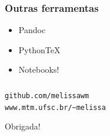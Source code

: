 \documentclass{beamer}
\begin{document}
\begin{frame}
  \frametitle{Outras ferramentas}
  \begin{itemize}
  \item Pandoc
  \item PythonTeX
  \item Notebooks!
  \end{itemize}
\end{frame}

\begin{frame}[fragile]
   \frametitle{}
   \begin{center}
      \begin{minipage}{0.7\textwidth}
      \begin{block}{}
         \begin{center}
            \verb+github.com/melissawm+\\
            \verb+www.mtm.ufsc.br/~melissa+
         \end{center}
      \end{block}
    \end{minipage}
    \vfill

    Obrigada!
   \end{center}
\end{frame}
\end{document}
